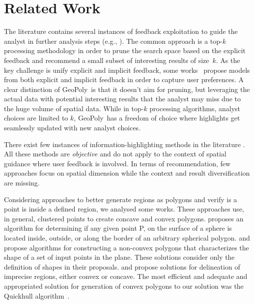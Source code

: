 \documentclass{vldb}
\newcommand{\sgg}{{\sc GeoPoly}}
\begin{document}
\section{Related Work}
The literature contains several instances of feedback exploitation to guide the analyst in further analysis steps (e.g., \cite{boley2013one}). The common approach is a top-$k$ processing methodology in order to prune the search space based on the explicit feedback and recommend a small subset of interesting results of size~$k$.  As the key challenge is unify
explicit and implicit feedback, some works~\cite{AoidhBW07,Ballatore2008,Liu:2010} propose models from both explicit and implicit feedback in order to capture user preferences. A clear distinction of \sgg\ is that it doesn't aim for pruning, but leveraging the actual data with potential interesting results that the analyst may miss due to the huge volume of spatial data. While in top-$k$ processing algorithms, analyst choices are limited to $k$, \sgg\ has a freedom of choice where highlights get seamlessly updated with new analyst choices. 

\vspace{2pt}
There exist few instances of information-highlighting methods in the literature \cite{Liang2010,Robinson2011,wongsuphasawat2016voyager,willett2007scented}. All these methods are {\em objective} and do not apply to the context of spatial guidance where user feedback is involved.  In terms of recommendation, few approaches focus on spatial dimension \cite{Bao2015,Levandoski:2012} while the context and result diversification are missing.

\vspace{2pt}
Considering approaches to better generate regions as polygons and verify is a point is inside a defined region, we analysed some works. These approaches use, in general, clustered points to create concave and convex polygons. \cite{Bevis1989} proposes an algorithm for determining if any given point P, on the surface of a sphere is located inside, outside, or along the border of an arbitrary spherical polygon. \cite{DUCKHAM2008} and  \cite{FADILI2004} propose algorithms for constructing a non-convex polygons that characterizes the shape of a set of input points in the plane. These solutions consider only the definition of shapes in their proposals. \cite{ARAMPATZIS2006} and \cite{Galton2006} propose solutions for delineation of imprecise regions, either convex or concave. The most efficient and adequate and appropriated solution for generation of  convex polygons to our solution was the Quickhull  algorithm~\cite{Barber:1996}.
\end{document}
